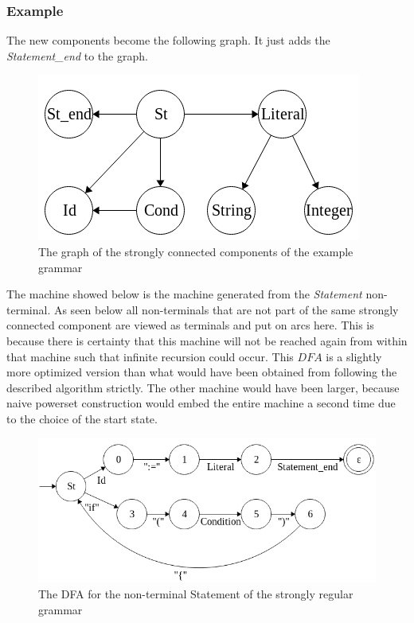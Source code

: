 	\subsubsection{Example}
	The new components become the following graph. It just adds the \textit{Statement\_end} to the graph.
	\begin{figure}[H]
		\centering
		\includegraphics[scale=0.7, keepaspectratio]{Figures/strRegular_chap2_graph.png}
		\decoRule
	 	\caption[Graph of the strongly connected components of the example grammar]{The graph of the strongly connected components of the example grammar}
	 	\label{fig:chap2:strRegularGraph}
	\end{figure}
	\noindent The machine showed below is the machine generated from the \textit{Statement} non-terminal. As seen below all non-terminals that are not part of the same strongly connected component are viewed as terminals and put on arcs here. This is because there is certainty that this machine will not be reached again from within that machine such that infinite recursion could occur. This $DFA$ is a slightly more optimized version than what would have been obtained from following the described algorithm strictly. The other machine would have been larger, because naive powerset construction would embed the entire machine a second time due to the choice of the start state.
	\begin{figure}[H]
			\centering
			\includegraphics[width=\textwidth, keepaspectratio]{Figures/NFA_Statement_chap2.png}
			\decoRule
		 	\caption[DFA for Statement of the example grammar]{The DFA for the non-terminal Statement of the strongly regular grammar}
		 	\label{fig:chap2:NFA:Statement}
		\end{figure}
	
